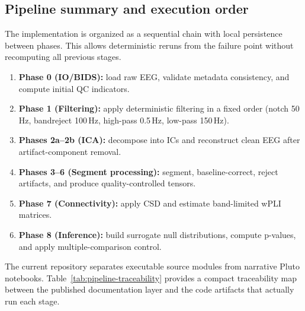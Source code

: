 \subsection{Pipeline summary and execution order}

The implementation is organized as a sequential chain with local persistence between phases. This allows deterministic reruns from the failure point without recomputing all previous stages.

\begin{tcolorbox}[
  enhanced,
  breakable,
  colback=blue!2,
  colframe=blue!55!black,
  coltitle=black,
  boxrule=0.6pt,
  arc=2mm,
  left=1.2mm,
  right=1.2mm,
  top=1mm,
  bottom=1mm,
  title=\textbf{Pipeline phases and execution order}
]
\begin{enumerate}[leftmargin=*,itemsep=2pt,topsep=2pt]
\item \textbf{Phase 0 (IO/BIDS):} load raw EEG, validate metadata consistency, and compute initial QC indicators.
\item \textbf{Phase 1 (Filtering):} apply deterministic filtering in a fixed order (notch 50\,Hz, bandreject 100\,Hz, high-pass 0.5\,Hz, low-pass 150\,Hz).
\item \textbf{Phases 2a--2b (ICA):} decompose into ICs and reconstruct clean EEG after artifact-component removal.
\item \textbf{Phases 3--6 (Segment processing):} segment, baseline-correct, reject artifacts, and produce quality-controlled tensors.
\item \textbf{Phase 7 (Connectivity):} apply CSD and estimate band-limited wPLI matrices.
\item \textbf{Phase 8 (Inference):} build surrogate null distributions, compute p-values, and apply multiple-comparison control.
\end{enumerate}
\end{tcolorbox}

The current repository separates executable source modules from narrative Pluto notebooks. Table~\ref{tab:pipeline-traceability} provides a compact traceability map between the published documentation layer and the code artifacts that actually run each stage.

